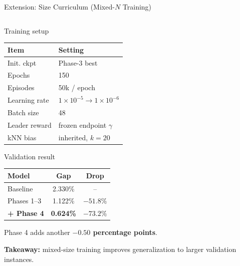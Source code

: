 \documentclass[aspectratio=169,11pt]{beamer}
\begin{document}
\begin{frame}[t]{Extension: Size Curriculum (Mixed-$N$ Training)}
\begin{columns}[T,onlytextwidth]
    \begin{column}{0.44\textwidth}
      \begin{block}{Training setup}
        \setlength{\tabcolsep}{2.6pt}
        \renewcommand{\arraystretch}{1.00}
        \begin{tabularx}{\linewidth}{@{}Y Y@{}}
          \toprule
          \textbf{Item} & \textbf{Setting} \\
          \midrule
          Init. ckpt & Phase-3 best \\
          Epochs & 150 \\
          Episodes & 50k / epoch \\
          Learning rate & $1{\times}10^{-5} \to 1{\times}10^{-6}$ \\
          Batch size & 48 \\
          Leader reward & frozen endpoint $\gamma$ \\
          kNN bias & inherited, $k=20$ \\
          \bottomrule
        \end{tabularx}
      \end{block}

      \vspace{-0.08cm}
      \begin{alertblock}{Validation result}
        \setlength{\tabcolsep}{2.6pt}
        \renewcommand{\arraystretch}{1.00}
        \begin{tabularx}{\linewidth}{@{}Y c c@{}}
          \toprule
          \textbf{Model} & \textbf{Gap} & \textbf{Drop} \\
          \midrule
          Baseline & 2.330\% & -- \\
          Phases 1--3 & 1.122\% & $-51.8\%$ \\
          \textbf{+ Phase 4} & \textbf{0.624\%} & \textbf{$-73.2\%$} \\
          \bottomrule
        \end{tabularx}

        \vspace{0.06cm}
        \centering
        {Phase 4 adds another \textbf{$-0.50$ percentage points}.}
      \end{alertblock}

      \vspace{-0.06cm}
      {\color{sdmblue}
      \textbf{Takeaway:} mixed-size training improves generalization to larger validation instances.}
    \end{column}
  \end{columns}
  \endgroup
\end{frame}
\end{document}
